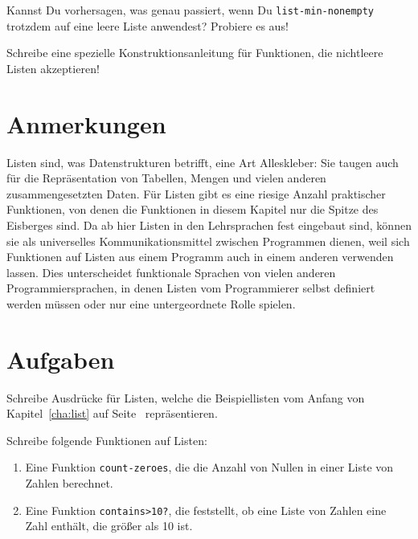 \begin{aufgabeinline}
  Kannst Du vorhersagen, was genau passiert, wenn Du
  \lstinline{list-min-nonempty} trotzdem auf eine leere Liste
  anwendest?  Probiere es aus!
\end{aufgabeinline}

\begin{aufgabeinline}
  Schreibe eine spezielle Konstruktionsanleitung für Funktionen, die
  nichtleere Listen akzeptieren!
\end{aufgabeinline}

\section*{Anmerkungen}

Listen sind, was Datenstrukturen betrifft, eine Art Alleskleber:
Sie taugen auch für die Repräsentation von Tabellen,
Mengen und vielen anderen zusammengesetzten Daten.  Für Listen gibt es
eine riesige Anzahl praktischer Funktionen, von denen die Funktionen in
diesem Kapitel nur die Spitze des Eisberges sind.  Da 
ab hier Listen in den Lehrsprachen fest eingebaut sind, können sie als universelles
Kommunikationsmittel zwischen Programmen dienen, weil sich Funktionen
auf Listen aus einem Programm auch in einem anderen verwenden lassen.
Dies unterscheidet funktionale Sprachen von vielen anderen Programmiersprachen, in
denen Listen vom Programmierer selbst definiert werden müssen oder nur
eine untergeordnete Rolle spielen.

\section*{Aufgaben}

\begin{aufgabe}
  Schreibe Ausdrücke für Listen, welche die Beispiellisten vom
  Anfang von Kapitel~\ref{cha:list} auf Seite~\pageref{cha:list} repräsentieren.
\end{aufgabe}

\begin{aufgabe}
Schreibe folgende Funktionen auf Listen:
  
  \begin{enumerate} 
    
  \item Eine Funktion \lstinline{count-zeroes}, die die Anzahl von Nullen
    in einer Liste von Zahlen berechnet.
    
  \item Eine Funktion \lstinline{contains>10?}, die feststellt, ob eine
    Liste von Zahlen eine Zahl enthält, die größer als 10 ist.
  \end{enumerate}
  
\end{aufgabe}

